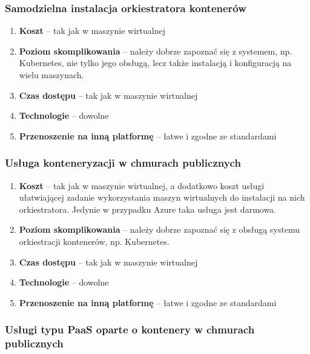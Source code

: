 \documentclass[12pt,a4paper,twoside,titlepage,openright]{book}
\begin{document}
\subsubsection{Samodzielna instalacja orkiestratora kontenerów}

\begin{enumerate}
	\item \textbf{Koszt} -- tak jak w maszynie wirtualnej
	\item \textbf{Poziom skomplikowania} -- należy dobrze zapoznać się z systemem, np. Kubernetes, nie tylko jego obsługą, lecz także instalacją i konfiguracją na wielu maszynach.
	\item \textbf{Czas dostępu} -- tak jak w maszynie wirtualnej
	\item \textbf{Technologie} -- dowolne
	\item \textbf{Przenoszenie na inną platformę} -- łatwe i zgodne ze standardami
\end{enumerate}

\subsubsection{Usługa konteneryzacji w chmurach publicznych}

\begin{enumerate}
	\item \textbf{Koszt} -- tak jak w maszynie wirtualnej, a dodatkowo koszt usługi ułatwiającej zadanie wykorzystania maszyn wirtualnych do instalacji na nich orkiestratora. Jedynie w przypadku Azure taka usługa jest darmowa.
	\item \textbf{Poziom skomplikowania} -- należy dobrze zapoznać się z obsługą systemu orkiestracji kontenerów, np. Kubernetes.
	\item \textbf{Czas dostępu} -- tak jak w maszynie wirtualnej
	\item \textbf{Technologie} -- dowolne
	\item \textbf{Przenoszenie na inną platformę} -- łatwe i zgodne ze standardami
\end{enumerate}


\subsubsection{Usługi typu PaaS oparte o kontenery w chmurach publicznych}
\end{document}
